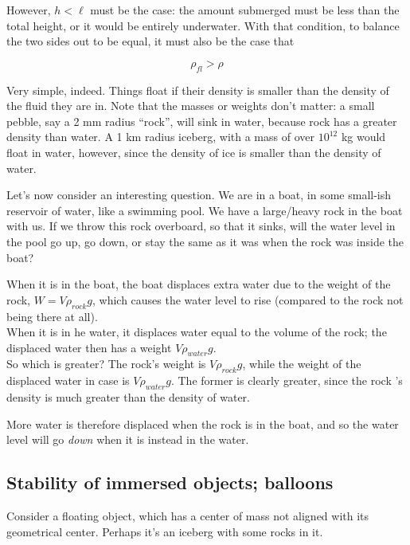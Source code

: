 However, $h < \ell$ must be the case: the amount submerged must be less than the total height, or it would be entirely underwater. With that condition, to balance the two sides out to be equal, it must also be the case that

\begin{equation}
\rho_{fl} > \rho
\end{equation}

Very simple, indeed. Things float if their density is smaller than the density of the fluid they are in. Note that the masses or weights don't matter: a small pebble, say a 2 mm radius ``rock'', will sink in water, because rock has a greater density than water. A 1 km radius iceberg, with a mass of over $10^{12}$ kg would float in water, however, since the density of ice is smaller than the density of water.

Let's now consider an interesting question. We are in a boat, in some small-ish reservoir of water, like a swimming pool. We have a large/heavy rock in the boat with us. If we throw this rock overboard, so that it sinks, will the water level in the pool go up, go down, or stay the same as it was when the rock was inside the boat?

When it is in the boat, the boat displaces extra water due to the weight of the rock, $W = V \rho_{rock} g$, which causes the water level to rise (compared to the rock not being there at all).\\
When it is in he water, it displaces water equal to the volume of the rock; the displaced water then has a weight $V \rho_{water} g$.\\
So which is greater? The rock's weight is $V \rho_{rock} g$, while the weight of the displaced water in case is $V \rho_{water} g$. The former is clearly greater, since the rock 's density is much greater than the density of water.

More water is therefore displaced when the rock is in the boat, and so the water level will go \emph{down} when it is instead in the water.

\subsection{Stability of immersed objects; balloons}

Consider a floating object, which has a center of mass not aligned with its geometrical center. Perhaps it's an iceberg with some rocks in it.

